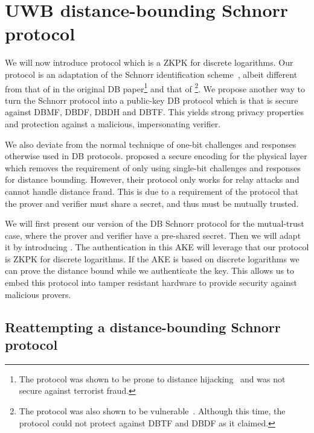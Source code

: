 \section{UWB distance-bounding Schnorr protocol}%
\label{DB-Schnorr-UWB}

We will now introduce  protocol which is a \ac{ZKPK} for discrete 
logarithms.
Our protocol is an adaptation of the Schnorr identification 
scheme~\cite{Schnorr}, albeit different from that of 
\textcite{DistanceBounding} in the original \ac{DB} paper\footnote{%
  The \citeauthor{DistanceBounding} protocol was shown to be prone to distance 
  hijacking~\cite{DistanceHijacking,TamarinDB} and was not secure against 
  terrorist fraud.
} and that of \textcite{Bussard-Bagga}\footnote{%
  The \citeauthor{Bussard-Bagga} protocol was also shown to be 
  vulnerable~\cite{Bussard-Bagga-attack}.
  Although this time, the protocol could not protect against \ac{DBTF} and 
  \ac{DBDF} as it claimed.
}.
We propose another way to turn the Schnorr protocol into a public-key \ac{DB} 
protocol which is  that is secure against \ac{DBMF}, \ac{DBDF}, 
\ac{DBDH} and \ac{DBTF}.
This yields strong privacy properties and protection against a malicious, 
impersonating verifier.

We also deviate from the normal technique of one-bit challenges and responses 
otherwise used in \ac{DB} protocols.
\Textcite{UWBPR} proposed a secure encoding for the physical 
layer which removes the requirement of only using single-bit challenges and 
responses for distance bounding.
However, their protocol only works for relay attacks and cannot handle distance 
fraud.
This is due to a requirement of the protocol that the prover and verifier must 
share a secret, and thus must be mutually trusted.

We will first present our version of the \ac{DB} Schnorr protocol for the 
mutual-trust case, where the prover and verifier have a pre-shared secret.
Then we will adapt it by introducing .
The authentication in this \ac{AKE} will leverage that our protocol is  
\ac{ZKPK} for discrete logarithms.
If the \ac{AKE} is based on discrete logarithms we can prove the distance bound 
while we authenticate the key.
This allows us to embed this protocol into tamper resistant hardware to provide 
security against malicious provers.


\subsection{Reattempting a distance-bounding Schnorr protocol}%
\label{DB-Schnorr}

